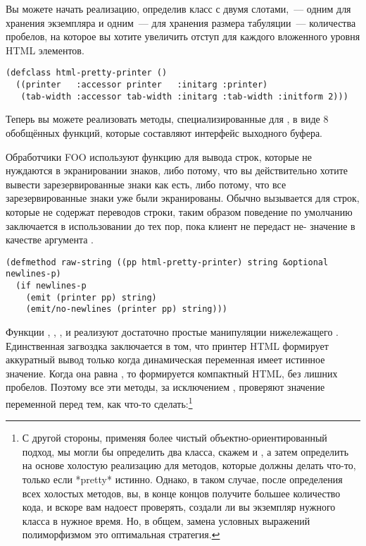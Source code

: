Вы можете начать реализацию, определив класс с двумя слотами,~--- одним для хранения
экземпляра  и одним~--- для хранения размера табуляции~---
количества пробелов, на которое вы хотите увеличить отступ для каждого вложенного уровня
HTML элементов.

\begin{lstlisting}
(defclass html-pretty-printer ()
  ((printer   :accessor printer   :initarg :printer)
   (tab-width :accessor tab-width :initarg :tab-width :initform 2)))
\end{lstlisting}

Теперь вы можете реализовать методы, специализированные для , в
виде 8 обобщённых функций, которые составляют интерфейс выходного буфера.

Обработчики FOO используют функцию  для вывода строк, которые не
нуждаются в экранировании знаков, либо потому, что вы действительно хотите вывести
зарезервированные знаки как есть, либо потому, что все зарезервированные знаки уже были
экранированы. Обычно  вызывается для строк, которые не содержат переводов
строки, таким образом поведение по умолчанию заключается в использовании
 до тех пор, пока клиент не передаст не- значение в
качестве аргумента .

\begin{lstlisting}
(defmethod raw-string ((pp html-pretty-printer) string &optional newlines-p)
  (if newlines-p
    (emit (printer pp) string)
    (emit/no-newlines (printer pp) string)))
\end{lstlisting}

Функции , , ,  и
 реализуют достаточно простые манипуляции нижележащего
. Единственная загвоздка заключается в том, что принтер HTML
формирует аккуратный вывод только когда динамическая переменная  имеет
истинное значение. Когда она равна , то формируется компактный HTML, без лишних
пробелов. Поэтому все эти методы, за исключением , проверяют значение
переменной  перед тем, как что-то сделать:\footnote{С другой стороны,
  применяя более чистый объектно-ориентированный подход, мы могли бы определить два
  класса, скажем  и , а затем определить
  на основе  холостую реализацию для методов, которые должны делать
  что-то, только если *pretty* истинно. Однако, в таком случае, после определения всех
  холостых методов, вы, в конце концов получите большее количество кода, и вскоре вам
  надоест проверять, создали ли вы экземпляр нужного класса в нужное время. Но, в общем,
  замена условных выражений полиморфизмом это оптимальная стратегия.}

